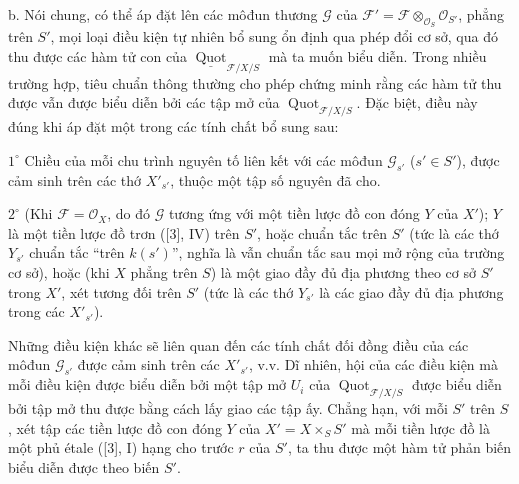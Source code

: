 \medskip
\noindent b. Nói chung, có thể áp đặt lên các môđun thương $\mathcal G$ của
$\mathcal F'=\mathcal F\otimes_{\mathcal O_S}\mathcal O_{S'}$, phẳng trên
$S'$, mọi loại điều kiện tự nhiên bổ sung ổn định qua phép đổi cơ sở, qua đó thu
được các hàm tử con của
$\underline{\operatorname{Quot}}_{\mathcal F/X/S}$ mà ta muốn biểu diễn. Trong
nhiều trường hợp, tiêu chuẩn thông thường cho phép chứng minh rằng các hàm tử
thu được vẫn được biểu diễn bởi các tập mở của
$\operatorname{Quot}_{\mathcal F/X/S}$. Đặc biệt, điều này đúng khi áp đặt một
trong các tính chất bổ sung sau:

\smallskip
\noindent $1^\circ$ Chiều của mỗi chu trình nguyên tố liên kết với các môđun
$\mathcal G_{s'}$ ($s'\in S'$), được cảm sinh trên các thớ $X'_{s'}$, thuộc
một tập số nguyên đã cho.

\smallskip
\noindent $2^\circ$ (Khi $\mathcal F=\mathcal O_X$, do đó $\mathcal G$ tương
ứng với một tiền lược đồ con đóng $Y$ của $X'$); $Y$ là một tiền lược đồ trơn
([3], IV) trên $S'$, hoặc chuẩn tắc trên $S'$ (tức là các thớ $Y_{s'}$ chuẩn
tắc ``trên $k(s')$'', nghĩa là vẫn chuẩn tắc sau mọi mở rộng của trường cơ
sở), hoặc (khi $X$ phẳng trên $S$) là một giao đầy đủ địa phương theo cơ sở
$S'$ trong $X'$, xét tương đối trên $S'$ (tức là các thớ $Y_{s'}$ là các giao
đầy đủ địa phương trong các $X'_{s'}$).

Những điều kiện khác sẽ liên quan đến các tính chất đối đồng điều
của các môđun $\mathcal G_{s'}$ được cảm sinh trên các $X'_{s'}$, v.v. Dĩ
nhiên, hội của các điều kiện mà mỗi điều kiện được biểu diễn bởi một tập mở
$U_i$ của $\operatorname{Quot}_{\mathcal F/X/S}$ được biểu diễn bởi tập mở thu
được bằng cách lấy giao các tập ấy. Chẳng hạn, với mỗi $S'$ trên $S$, xét tập
các tiền lược đồ con đóng $Y$ của $X'=X\times_SS'$ mà mỗi tiền lược đồ là một
phủ étale ([3], I) hạng cho trước $r$ của $S'$, ta thu được một hàm tử phản biến
biểu diễn được theo biến $S'$.


